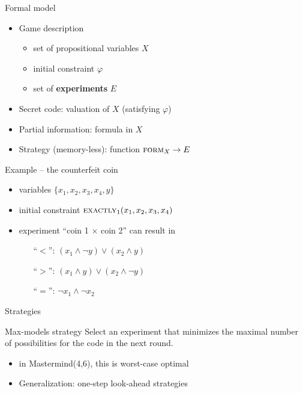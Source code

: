 \documentclass{beamer}
\begin{document}
\begin{frame}{Formal model}
\begin{itemize}
\item Game description
\begin{itemize}
\item set of propositional variables $X$
\item initial constraint $\varphi$
\item set of \textbf{experiments} $E$
\end{itemize}

\item Secret code: valuation of $X$ (satisfying $\varphi$)
\item Partial information: formula in $X$
\item Strategy (memory-less): function $\textsc{form}_X \rightarrow E$
\end{itemize}
\end{frame}

\begin{frame}{Example -- the counterfeit coin}
\begin{itemize}
\item variables $\{x_1, x_2, x_3, x_4, y\}$
\item initial constraint $\textsc{exactly}_1(x_1, x_2, x_3, x_4)$
\item experiment ``coin 1 $\times$ coin 2'' can result in \medskip
  \begin{enumerate}\itemsep 5pt
  \item[``$<$'':] $(x_1\wedge \neg y) \vee (x_2\wedge y)$
  \item[``$>$'':] $(x_1 \wedge y) \vee (x_2\wedge\neg y)$
  \item[``$=$'':] $\neg x_1 \wedge \neg x_2 $
  \end{enumerate}
\end{itemize}
\end{frame}

\begin{frame}{Strategies}

\begin{block}{Max-models strategy}
Select an experiment that minimizes the maximal number
  of possibilities for the code in the next round.
\end{block}

\bigskip
\begin{itemize}\itemsep 5pt
\item in Mastermind(4,6), this is worst-case optimal
\item Generalization: one-step look-ahead strategies
\end{itemize}

\end{frame}
\end{document}
